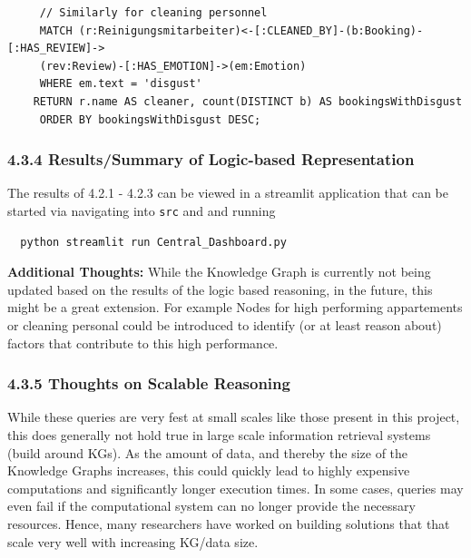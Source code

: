 \documentclass[
]{article}
\begin{document}
\vspace*{10mm}

\begin{lstlisting}
     // Similarly for cleaning personnel
     MATCH (r:Reinigungsmitarbeiter)<-[:CLEANED_BY]-(b:Booking)-[:HAS_REVIEW]->
     (rev:Review)-[:HAS_EMOTION]->(em:Emotion)
     WHERE em.text = 'disgust'
    RETURN r.name AS cleaner, count(DISTINCT b) AS bookingsWithDisgust
     ORDER BY bookingsWithDisgust DESC;
\end{lstlisting}

\pagebreak


\subsubsection{4.3.4 Results/Summary of Logic-based
Representation}\label{resultssummary-of-logic-based-representation}

The results of 4.2.1 - 4.2.3 can be viewed in a streamlit application
that can be started via navigating into \texttt{src} and and running

\begin{lstlisting}
  python streamlit run Central_Dashboard.py
\end{lstlisting}


\textbf{Additional Thoughts:} While the Knowledge Graph is currently not
being updated based on the results of the logic based reasoning, in the
future, this might be a great extension. For example Nodes for high
performing appartements or cleaning personal could be introduced to
identify (or at least reason about) factors that contribute to this high
performance.

\subsubsection{4.3.5 Thoughts on Scalable
Reasoning}\label{thoughts-on-scalable-reasoning}

While these queries are very fest at small scales like those present in
this project, this does generally not hold true in large scale
information retrieval systems (build around KGs). As the amount of data,
and thereby the size of the Knowledge Graphs increases, this could
quickly lead to highly expensive computations and significantly longer
execution times. In some cases, queries may even fail if the
computational system can no longer provide the necessary resources.
Hence, many researchers have worked on building solutions that that
scale very well with increasing KG/data size.
\end{document}
